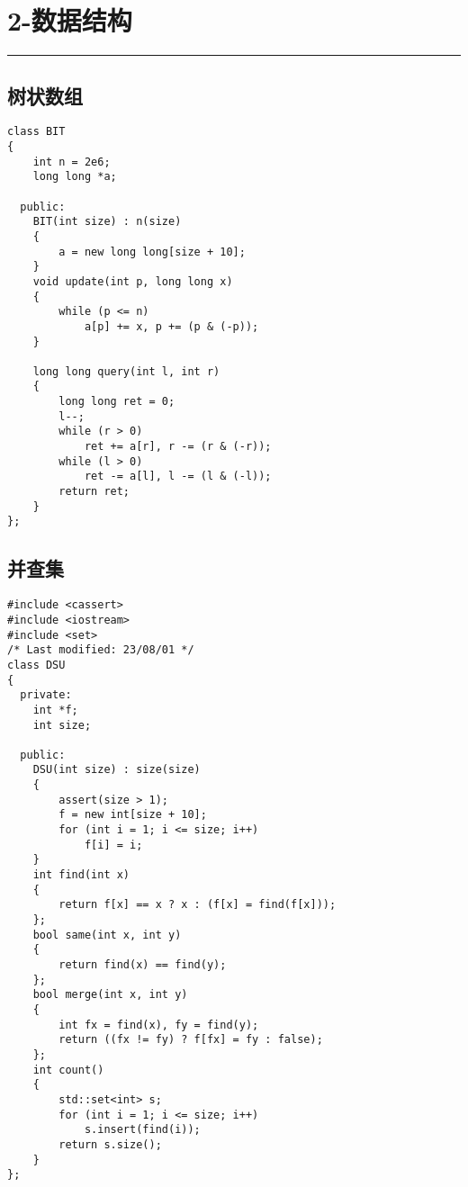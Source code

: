 \documentclass[]{article}
\begin{document}
\hypertarget{ux6570ux636eux7ed3ux6784}{%
\section{2-数据结构}\label{ux6570ux636eux7ed3ux6784}}

\begin{center}\rule{0.5\linewidth}{0.5pt}\end{center}

\hypertarget{ux6811ux72b6ux6570ux7ec4}{%
\subsection{树状数组}\label{ux6811ux72b6ux6570ux7ec4}}

\begin{verbatim}
class BIT
{
    int n = 2e6;
    long long *a;

  public:
    BIT(int size) : n(size)
    {
        a = new long long[size + 10];
    }
    void update(int p, long long x)
    {
        while (p <= n)
            a[p] += x, p += (p & (-p));
    }

    long long query(int l, int r)
    {
        long long ret = 0;
        l--;
        while (r > 0)
            ret += a[r], r -= (r & (-r));
        while (l > 0)
            ret -= a[l], l -= (l & (-l));
        return ret;
    }
};

\end{verbatim}

\hypertarget{ux5e76ux67e5ux96c6}{%
\subsection{并查集}\label{ux5e76ux67e5ux96c6}}

\begin{verbatim}
#include <cassert>
#include <iostream>
#include <set>
/* Last modified: 23/08/01 */
class DSU
{
  private:
    int *f;
    int size;

  public:
    DSU(int size) : size(size)
    {
        assert(size > 1);
        f = new int[size + 10];
        for (int i = 1; i <= size; i++)
            f[i] = i;
    }
    int find(int x)
    {
        return f[x] == x ? x : (f[x] = find(f[x]));
    };
    bool same(int x, int y)
    {
        return find(x) == find(y);
    };
    bool merge(int x, int y)
    {
        int fx = find(x), fy = find(y);
        return ((fx != fy) ? f[fx] = fy : false);
    };
    int count()
    {
        std::set<int> s;
        for (int i = 1; i <= size; i++)
            s.insert(find(i));
        return s.size();
    }
};
\end{verbatim}
\end{document}
